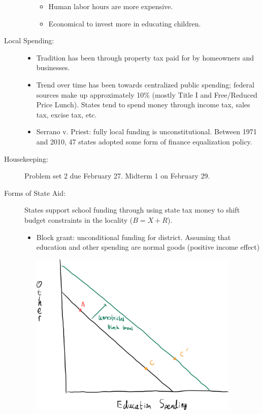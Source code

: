 \documentclass[10pt]{extarticle}
\begin{document}
\begin{description}
\begin{itemize}
\begin{itemize}
            \item Human labor hours are more expensive.
            \item Economical to invest more in educating children.
          \end{itemize}
      \end{itemize}
    \item[Local Spending:] \hfill
      \begin{itemize}
        \item Tradition has been through property tax paid for by homeowners and businesses.
        \item Trend over time has been towards centralized public spending; federal sources make up approximately 10\% (mostly Title I and Free/Reduced Price Lunch). States tend to spend money through income tax, sales tax, excise tax, etc.
        \item Serrano v. Priest: fully local funding is unconstitutional. Between 1971 and 2010, 47 states adopted some form of finance equalization policy.
      \end{itemize}
    \item[Housekeeping:] Problem set 2 due February 27. Midterm 1 on February 29.
    \item[Forms of State Aid:] States support school funding through using state tax money to shift budget constraints in the locality ($B = X + R$).
      \begin{itemize}
        \item Block grant: unconditional funding for district. Assuming that education and other spending are normal goods (positive income effect)
          \begin{center}
            \includegraphics[width=10cm]{images/unrestricted_block_grant.png}
          \end{center}

\end{itemize}
\end{description}
\end{document}
